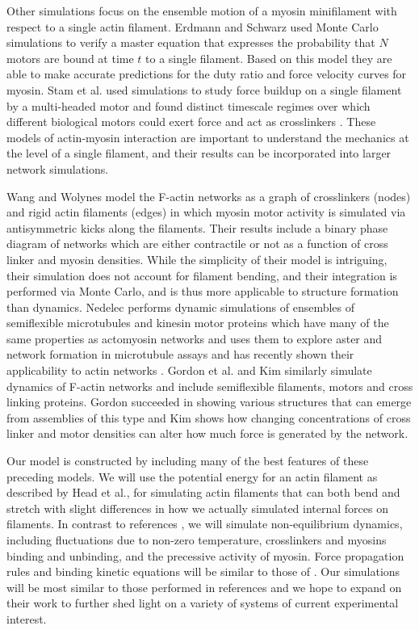 \documentclass[12pt]{article}
\begin{document}
\par
Other simulations focus on the ensemble motion of a myosin minifilament with respect to a single actin filament.  
Erdmann and Schwarz used Monte Carlo simulations to verify a master equation that expresses the probability that $N$ motors are 
bound at time $t$ to a single filament\cite{erdmann2012}. Based on this model they are able to make accurate predictions for 
the duty ratio and force velocity curves for myosin. Stam et al. used simulations to study force buildup on a single 
filament by a multi-headed motor and found
distinct timescale regimes over which different biological motors could exert force and act as crosslinkers
\cite{stam2015}. These models of actin-myosin interaction are important to understand the mechanics at
the level of a single filament, and their results can be incorporated into larger network simulations. 
\par
Wang and Wolynes \cite{wang2012} model the F-actin networks as a graph of crosslinkers (nodes) and rigid actin filaments
(edges) in which myosin motor activity is simulated via antisymmetric kicks along the filaments. Their results include a
binary phase diagram of networks which are either contractile or not as a function of cross linker and myosin
densities. While the simplicity of their model is intriguing, their simulation does not account for filament bending, 
and their integration is performed via Monte Carlo, and is thus more applicable to structure formation than dynamics.
Nedelec performs dynamic simulations of ensembles of semiflexible microtubules and kinesin motor proteins
which have many of the same properties as actomyosin networks and uses them to explore aster and network formation in microtubule
assays \cite{nedelec2007} and has recently shown their applicability to actin networks \cite{ennomani2016}.
Gordon et al. \cite{gordon2012} and Kim \cite{kim2014} similarly simulate dynamics of F-actin networks and include
semiflexible filaments, motors and cross linking proteins. Gordon succeeded in showing various structures that can emerge
from assemblies of this type and Kim shows how changing concentrations of cross linker and motor densities can alter how
much force is generated by the network.
\par
Our model is constructed by including many of the best features of these preceding models.
We will use the potential energy for an actin filament as described by Head et al., for simulating actin filaments that can 
both bend and stretch with slight differences in how we actually simulated 
internal forces on filaments. In contrast to references \cite{head2003, dasanyake2011}, we will 
simulate non-equilibrium dynamics, including fluctuations due to non-zero temperature,  
crosslinkers and myosins binding and unbinding, and the precessive activity of myosin.  
Force propagation rules and binding kinetic equations will be similar to those of
\cite{nedelec2007, gordon2012}. Our simulations will be most similar to those
performed in references \cite{kim2014, ennomani2016} and we hope to expand on
their work to further shed light on a variety of systems of current experimental interest. 
\end{document}
